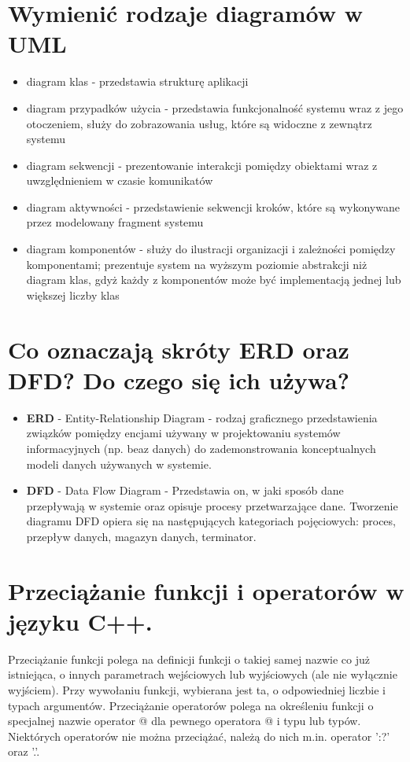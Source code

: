 \documentclass[12pt,a4paper]{article}
\begin{document}
	\section{Wymienić rodzaje diagramów w UML}
	\begin{itemize}
		\item diagram klas - przedstawia strukturę aplikacji
		\item diagram przypadków użycia - przedstawia funkcjonalność systemu wraz z jego otoczeniem, służy do zobrazowania usług, które są widoczne z zewnątrz systemu
		\item diagram sekwencji - prezentowanie interakcji pomiędzy obiektami wraz z uwzględnieniem w czasie komunikatów
		\item diagram aktywności - przedstawienie sekwencji kroków, które są wykonywane przez modelowany fragment systemu
		\item diagram komponentów - służy do ilustracji organizacji i zależności pomiędzy komponentami; prezentuje system na wyższym poziomie abstrakcji niż diagram klas, gdyż każdy z komponentów może być implementacją jednej lub większej liczby klas
	\end{itemize}

	\section{Co oznaczają skróty ERD oraz DFD? Do czego się ich używa?}
	\begin{itemize}
		\item \textbf{ERD} - Entity-Relationship Diagram - rodzaj graficznego przedstawienia związków pomiędzy encjami używany w projektowaniu systemów informacyjnych (np. beaz danych) do zademonstrowania konceptualnych modeli danych używanych w systemie.
		\item \textbf{DFD} - Data Flow Diagram - Przedstawia on, w jaki sposób dane przepływają w systemie oraz opisuje procesy przetwarzające dane. Tworzenie diagramu DFD opiera się na następujących kategoriach pojęciowych: proces, przepływ danych, magazyn danych, terminator.
	\end{itemize}

	\section{Przeciążanie funkcji i operatorów w języku C++.}
	\label{sec:przecfuncpp}
	Przeciążanie funkcji polega na definicji funkcji o takiej samej nazwie co już istniejąca, o innych parametrach wejściowych lub wyjściowych (ale nie wyłącznie wyjściem). Przy wywołaniu funkcji, wybierana jest ta, o odpowiedniej liczbie i typach argumentów.
	Przeciążanie operatorów polega na określeniu funkcji o specjalnej nazwie operator @ dla pewnego operatora @ i typu lub typów. Niektórych operatorów nie można przeciążać, należą do nich m.in. operator ':?' oraz '.'.
\end{document}
